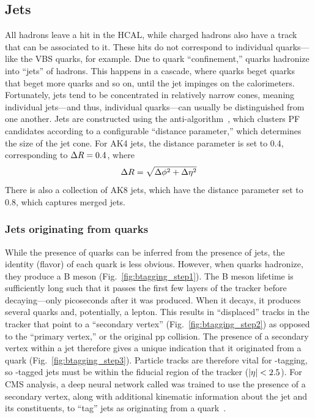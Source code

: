 \subsection{Jets}
All hadrons leave a hit in the HCAL, while charged hadrons also have a track that can be associated to it. 
These hits do not correspond to individual quarks---like the VBS quarks, for example. 
Due to quark ``confinement,'' quarks hadronize into ``jets'' of hadrons. 
This happens in a cascade, where quarks beget quarks that beget more quarks and so on, until the jet impinges on the calorimeters. 
Fortunately, jets tend to be concentrated in relatively narrow cones, meaning individual jets---and thus, individual quarks---can usually be distinguished from one another. 
Jets are constructed using the anti-\kt algorithm~\cite{Cacciari:2008gp, Cacciari:2011ma}, which clusters PF candidates according to a configurable ``distance parameter,'' which determines the size of the jet cone. %
For AK4 jets, the distance parameter is set to 0.4, corresponding to $\Delta R = 0.4$, where
\begin{equation}
    \Delta R = \sqrt{\Delta\phi^2 + \Delta\eta^2}
\end{equation}
There is also a collection of AK8 jets, which have the distance parameter set to 0.8, which captures merged jets.

\subsubsection{Jets originating from \Pb quarks}
While the presence of quarks can be inferred from the presence of jets, the identity (flavor) of each quark is less obvious. 
However, when \Pb quarks hadronize, they produce a B meson (Fig.~\ref{fig:btagging_step1}). 
The B meson lifetime is sufficiently long such that it passes the first few layers of the tracker before decaying---only picoseconds after it was produced. 
When it decays, it produces several quarks and, potentially, a lepton. 
This results in ``displaced'' tracks in the tracker that point to a ``secondary vertex'' (Fig.~\ref{fig:btagging_step2}) as opposed to the ``primary vertex,'' or the original pp collision. 
The presence of a secondary vertex within a jet therefore gives a unique indication that it originated from a \Pb quark (Fig.~\ref{fig:btagging_step3}). 
Particle tracks are therefore vital for \Pb-tagging, so \Pb-tagged jets must be within the fiducial region of the tracker ($\lvert \eta \rvert < 2.5$). 
For CMS analysis, a deep neural network called \DeepJet was trained to use the presence of a secondary vertex, along with additional kinematic information about the jet and its constituents, to ``tag'' jets as originating from a \Pb quark~\cite{Bols:2020bkb}. 

